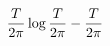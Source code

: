 \documentclass{article}
\begin{document}
\[
\color[rgb]{0.000,0.000,0.000} {
\dfrac{T}{2\pi}\log\dfrac{T}{2\pi} - \dfrac{T}{2\pi}}
\]
\end{document}
